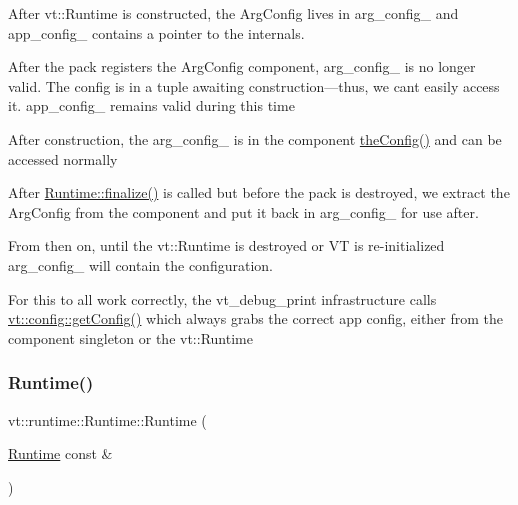 \begin{DoxyItemize}
\item After {\ttfamily vt\+::\+Runtime} is constructed, the Arg\+Config lives in {\ttfamily arg\+\_\+config\+\_\+} and {\ttfamily app\+\_\+config\+\_\+} contains a pointer to the internals.
\item After the pack registers the Arg\+Config component, {\ttfamily arg\+\_\+config\+\_\+} is no longer valid. The config is in a tuple awaiting construction---thus, we can\textquotesingle{}t easily access it. app\+\_\+config\+\_\+ remains valid during this time
\item After construction, the {\ttfamily arg\+\_\+config\+\_\+} is in the component {\ttfamily \hyperlink{namespacevt_aa17c6eae35e7e41a8b11d4047b7c0839}{the\+Config()}} and can be accessed normally
\item After {\ttfamily \hyperlink{structvt_1_1runtime_1_1_runtime_a3408b946864c17bd6d3cb7beb030a380}{Runtime\+::finalize()}} is called but before the pack is destroyed, we extract the {\ttfamily Arg\+Config} from the component and put it back in {\ttfamily arg\+\_\+config\+\_\+} for use after.
\item From then on, until the {\ttfamily vt\+::\+Runtime} is destroyed or VT is re-\/initialized {\ttfamily arg\+\_\+config\+\_\+} will contain the configuration.

For this to all work correctly, the {\ttfamily vt\+\_\+debug\+\_\+print} infrastructure calls {\ttfamily \hyperlink{namespacevt_1_1config_a1074763aad1aa8a8e788a79e014fd82b}{vt\+::config\+::get\+Config()}} which always grabs the correct app config, either from the component singleton or the {\ttfamily vt\+::\+Runtime} 


\end{DoxyItemize}\mbox{\label{structvt_1_1runtime_1_1_runtime_a42d87d965f2a283dbaf484b36b6a0c39}} 
\subsubsection{\texorpdfstring{Runtime()}{Runtime()}\hspace{0.1cm}{\footnotesize\ttfamily [2/3]}}
{\footnotesize\ttfamily vt\+::runtime\+::\+Runtime\+::\+Runtime (\begin{DoxyParamCaption}\item[{\hyperlink{structvt_1_1runtime_1_1_runtime}{Runtime} const \&}]{ }\end{DoxyParamCaption})\hspace{0.3cm}{\ttfamily [delete]}}

